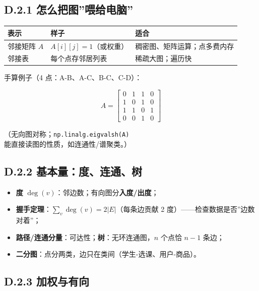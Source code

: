 \subsection{D.2.1
怎么把图''喂给电脑''}\label{d.2.1-ux600eux4e48ux628aux56feux5582ux7ed9ux7535ux8111}

{\def\LTcaptype{none} %
\begin{longtable}[]{@{}lll@{}}
\toprule\noalign{}
表示 & 样子 & 适合 \\
\midrule\noalign{}
\endhead
\bottomrule\noalign{}
\endlastfoot
邻接矩阵 \(A\) & \(A[i][j]=1\)（或权重） &
稠密图、矩阵运算；点多费内存 \\
邻接表 & 每个点存邻居列表 & 稀疏大图；遍历快 \\
\end{longtable}
}

手算例子（4 点：A-B、A-C、B-C、C-D）：

\[A=\begin{bmatrix}0&1&1&0\\1&0&1&0\\1&1&0&1\\0&0&1&0\end{bmatrix}\]

（无向图对称；\texttt{np.linalg.eigvalsh(A)}
能直接读图的性质，如连通性/谱聚类。）

\subsection{D.2.2
基本量：度、连通、树}\label{d.2.2-ux57faux672cux91cfux5ea6ux8fdeux901aux6811}

\begin{itemize}
\tightlist
\item
  \textbf{度} \(\deg(v)\)：邻边数；有向图分\textbf{入度/出度}；
\item
  \textbf{握手定理}：\(\sum_v \deg(v)=2|E|\)（每条边贡献 2
  度）------检查数据是否''边数对着''；
\item
  \textbf{路径/连通分量}：可达性；\textbf{树}：无环连通图，\(n\) 个点恰
  \(n-1\) 条边；
\item
  \textbf{二分图}：点分两类，边只在类间（学生-选课、用户-商品）。
\end{itemize}

\subsection{D.2.3
加权与有向}\label{d.2.3-ux52a0ux6743ux4e0eux6709ux5411}

